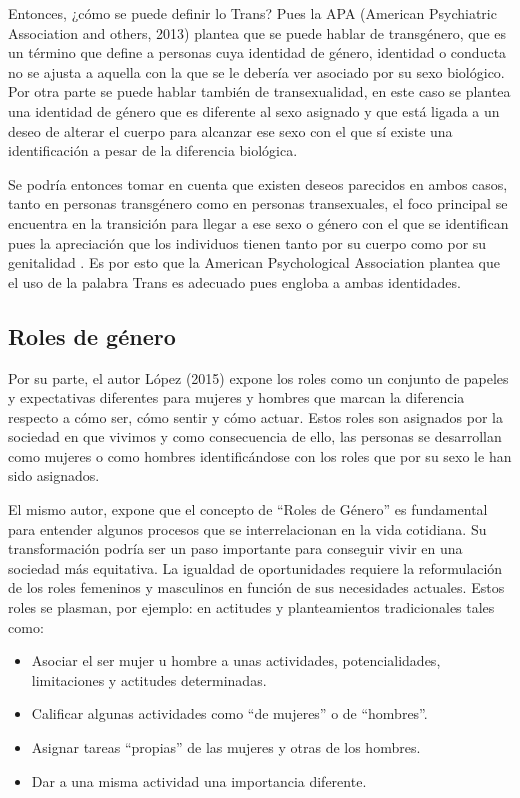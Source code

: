 Entonces, ¿cómo se puede definir lo Trans? Pues la APA (American Psychiatric
Association and others, 2013) plantea que se puede hablar de transgénero, que es
un término que define a personas cuya identidad de género, identidad o conducta
no se ajusta a aquella con la que se le debería ver asociado por su sexo
biológico.
Por otra parte se puede hablar también de transexualidad, en este caso se
plantea una identidad de género que es diferente al sexo asignado y que está
ligada a un deseo de alterar el cuerpo para alcanzar ese sexo con el que sí
existe una identificación a pesar de la diferencia biológica.

Se podría entonces tomar en cuenta que existen deseos parecidos en ambos casos,
tanto en personas transgénero como en personas transexuales, el foco principal
se encuentra en la transición para llegar a ese sexo o género con el que se
identifican pues la apreciación que los individuos tienen tanto por su cuerpo
como por su genitalidad .
Es por esto que la American Psychological Association plantea que el uso de la
palabra Trans es adecuado pues engloba a ambas identidades.

\subsection{Roles de género}
Por su parte, el autor López (2015) expone los roles como un conjunto de papeles
y expectativas diferentes para mujeres y hombres que marcan la diferencia
respecto a cómo ser, cómo sentir y cómo actuar.
Estos roles son asignados por la sociedad en que vivimos y como consecuencia de
ello, las personas se desarrollan como mujeres o como hombres identificándose
con los roles que por su sexo le han sido asignados.

El mismo autor, expone que el concepto de “Roles de Género” es fundamental para
entender algunos procesos que se interrelacionan en la vida cotidiana.
Su transformación podría ser un paso importante para conseguir vivir en una
sociedad más equitativa.
La igualdad de oportunidades requiere la reformulación de los roles femeninos y
masculinos en función de sus necesidades actuales.
Estos roles se plasman, por ejemplo: en actitudes y planteamientos tradicionales
tales como:

\begin{itemize}
    \item Asociar el ser mujer u hombre a unas actividades, potencialidades,
    limitaciones y actitudes determinadas.
    \item Calificar algunas actividades como “de mujeres” o de “hombres”.
    \item Asignar tareas “propias” de las mujeres y otras de los hombres.
    \item Dar a una misma actividad una importancia diferente.
\end{itemize}

